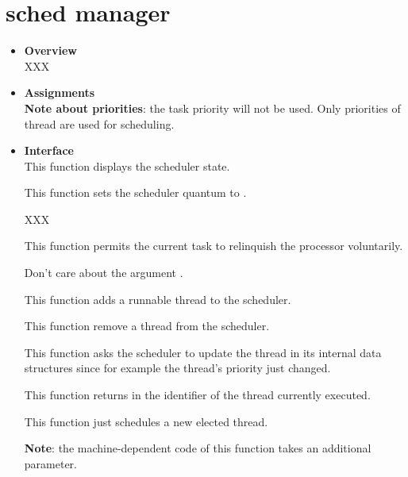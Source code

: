 \section{\textbf{sched} manager}
\begin{itemize}
  \item {\bf Overview}\\

    XXX

  \item {\bf Assignments}\\

    \textbf{Note about priorities}: the task priority will not be
    used. Only priorities of thread are used for scheduling.

  \item {\bf Interface}\\

	 {
	   This function displays the scheduler state.
	 }

	 {
	   This function sets the scheduler quantum to .

	   XXX
	 }

	 {
	   This function permits the current task to relinquish
	   the processor voluntarily.

	   Don't care about the argument .
	 }

	 {
	   This function adds a runnable thread to the scheduler.
	 }

	 {
	   This function remove a thread from the scheduler.
	 }

	 {
	   This function asks the scheduler to update the thread
	    in its internal data structures since
	   for example the thread's priority just changed.
	 }

	 {
	   This function returns in  the identifier
	   of the thread currently executed.
	 }

	 {
	   This function just schedules a new elected thread.

	   \textbf{Note}: the machine-dependent code of this function
	   takes an additional parameter.

}
\end{itemize}
